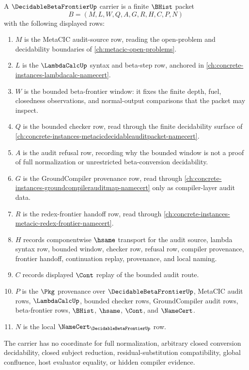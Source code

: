 \begin{definition}
\label{def:decidable-beta-frontier-carrier}
A $\DecidableBetaFrontierUp$ carrier is a finite $\BHist$ packet
$$
B=(M,L,W,Q,A,G,R,H,C,P,N)
$$
with the following displayed rows:
\begin{enumerate}
\item $M$ is the MetaCIC audit-source row, reading the open-problem and decidability boundaries of \autoref{ch:metacic-open-problems}.
\item $L$ is the $\LambdaCalcUp$ syntax and beta-step row, anchored in \autoref{ch:concrete-instances-lambdacalc-namecert}.
\item $W$ is the bounded beta-frontier window: it fixes the finite depth, fuel, closedness observations, and normal-output comparisons that the packet may inspect.
\item $Q$ is the bounded checker row, read through the finite decidability surface of \autoref{ch:concrete-instances-metacicdecidableauditpacket-namecert}.
\item $A$ is the audit refusal row, recording why the bounded window is not a proof of full normalization or unrestricted beta-conversion decidability.
\item $G$ is the GroundCompiler provenance row, read through \autoref{ch:concrete-instances-groundcompilerauditmap-namecert} only as compiler-layer audit data.
\item $R$ is the redex-frontier handoff row, read through \autoref{ch:concrete-instances-metacic-redex-frontier-namecert}.
\item $H$ records componentwise $\hsame$ transport for the audit source, lambda syntax row, bounded window, checker row, refusal row, compiler provenance, frontier handoff, continuation replay, provenance, and local naming.
\item $C$ records displayed $\Cont$ replay of the bounded audit route.
\item $P$ is the $\Pkg$ provenance over $\DecidableBetaFrontierUp$, MetaCIC audit rows, $\LambdaCalcUp$, bounded checker rows, GroundCompiler audit rows, beta-frontier rows, $\BHist$, $\hsame$, $\Cont$, and $\NameCert$.
\item $N$ is the local $\NameCert_{\DecidableBetaFrontierUp}$ row.
\end{enumerate}
The carrier has no coordinate for full normalization, arbitrary closed conversion decidability, closed subject reduction, residual-substitution compatibility, global confluence, host evaluator equality, or hidden compiler evidence.
\end{definition}

